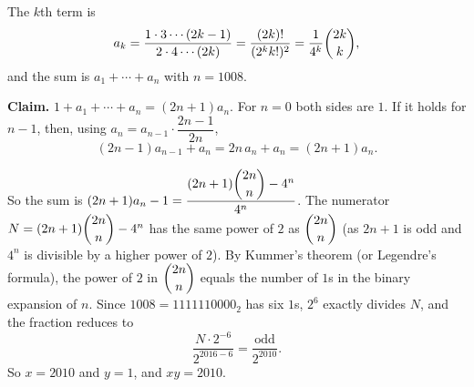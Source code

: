 The $k$th term is
\[
a_k=\dfrac{1\cdot3\cdots(2k-1)}{2\cdot4\cdots(2k)}=\dfrac{(2k)!}{(2^kk!)^2}=\dfrac{1}{4^k}\dbinom{2k}{k},
\]
and the sum is $a_1+\cdots+a_n$ with $n=1008$.

\textbf{Claim.} $1+a_1+\cdots+a_n=(2n+1)a_n$. For $n=0$ both sides are $1$. If it holds for $n-1$, then, using $a_n=a_{n-1}\cdot\dfrac{2n-1}{2n}$,
\[
(2n-1)a_{n-1}+a_n=2n\,a_n+a_n=(2n+1)a_n .
\]

So the sum is $(2n+1)a_n-1=\dfrac{(2n+1)\dbinom{2n}{n}-4^n}{4^n}$. The numerator $N=(2n+1)\dbinom{2n}{n}-4^n$ has the same power of $2$ as $\dbinom{2n}{n}$ (as $2n+1$ is odd and $4^n$ is divisible by a higher power of $2$). By Kummer's theorem (or Legendre's formula), the power of $2$ in $\dbinom{2n}{n}$ equals the number of $1$s in the binary expansion of $n$. Since $1008=1111110000_2$ has six $1$s, $2^6$ exactly divides $N$, and the fraction reduces to
\[
\dfrac{N\cdot2^{-6}}{2^{2016-6}}=\dfrac{\text{odd}}{2^{2010}} .
\]
So $x=2010$ and $y=1$, and $xy=\boxed{2010}$.
